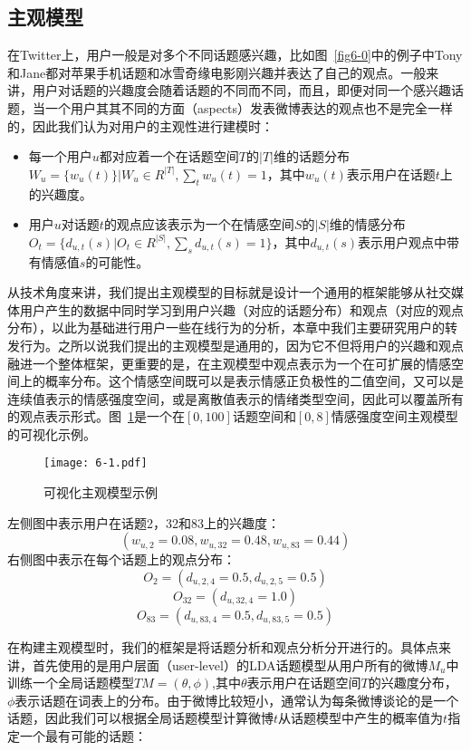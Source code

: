 \subsection{主观模型}
\label{subjectivemodel}
在Twitter上，用户一般是对多个不同话题感兴趣，比如图~\ref{fig6-0}中的例子中Tony和Jane都对苹果手机话题和冰雪奇缘电影刚兴趣并表达了自己的观点。一般来讲，用户对话题的兴趣度会随着话题的不同而不同，而且，即便对同一个感兴趣话题，当一个用户其其不同的方面（aspects）发表微博表达的观点也不是完全一样的，因此我们认为对用户的主观性进行建模时：
\begin{itemize}
\item 每一个用户$ u $都对应着一个在话题空间$ T $的$ |T| $维的话题分布$ W_{u}=\{w_u(t)\}|W_u \in R^{|T|},\sum_{t}w_{u}(t)=1 $，其中$ w_{u}(t) $表示用户在话题$ t $上的兴趣度。
\item 用户$ u $对话题$ t $的观点应该表示为一个在情感空间$ S $的$ |S| $维的情感分布$ O_t=\{d_{u,t}(s)| O_t \in R^{|S|}, \sum_{s}d_{u,t}(s)=1\}$，其中$ d_{u,t}(s) $表示用户观点中带有情感值$ s $的可能性。
\end{itemize}

从技术角度来讲，我们提出主观模型的目标就是设计一个通用的框架能够从社交媒体用户产生的数据中同时学习到用户兴趣（对应的话题分布）和观点（对应的观点分布），以此为基础进行用户一些在线行为的分析，本章中我们主要研究用户的转发行为。之所以说我们提出的主观模型是通用的，因为它不但将用户的兴趣和观点融进一个整体框架，更重要的是，在主观模型中观点表示为一个在可扩展的情感空间上的概率分布。这个情感空间既可以是表示情感正负极性的二值空间，又可以是连续值表示的情感强度空间，或是离散值表示的情绪类型空间，因此可以覆盖所有的观点表示形式。图~\ref{fig6-1}是一个在$ [0,100] $话题空间和$ [0,8] $情感强度空间主观模型的可视化示例。

\begin{figure}[htp]
\centering
\texttt{[image: 6-1.pdf]}
\caption{可视化主观模型示例}
\label{fig6-1}
\end{figure}
左侧图中表示用户在话题2，32和83上的兴趣度：$$ (  w_{u,2}=0.08,w_{u,32}=0.48, w_{u,83}=0.44)  $$
右侧图中表示在每个话题上的观点分布：
$$ O_{2}=( d_{u,2,4} =0.5, d_{u,2,5} =0.5)$$
$$O_{32}=(d_{u,32,4}=1.0) $$ $$O_{83}=( d_{u,83,4}=0.5, d_{u,83,5}=0.5 )$$

在构建主观模型时，我们的框架是将话题分析和观点分析分开进行的。具体点来讲，首先使用的是用户层面（user-level）的LDA话题模型从用户所有的微博$M_u$中训练一个全局话题模型$ TM=(\theta,\phi) $,其中$ \theta $表示用户在话题空间$ T $的兴趣度分布，$ \phi $表示话题在词表上的分布。由于微博比较短小，通常认为每条微博谈论的是一个话题，因此我们可以根据全局话题模型计算微博$ t $从话题模型中产生的概率值为$ t $指定一个最有可能的话题：


